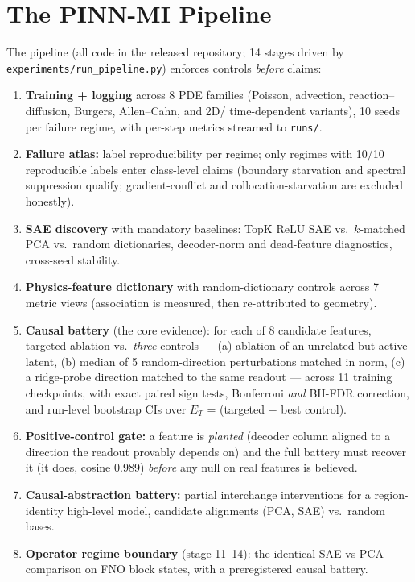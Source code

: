 \documentclass{article}
\newcommand{\ET}{E_T}
\begin{document}
\begin{table}[t]\centering\small
\caption{Geometry across the dimensional boundary: tangent rank equals input dimension; covariance participation ratio stays low.}\label{tab:geometry}

\end{table}

\section{The PINN-MI Pipeline}
\label{sec:method}

The pipeline (all code in the released repository; 14 stages driven by
\texttt{experiments/run\_pipeline.py}) enforces controls \emph{before} claims:

\begin{enumerate}
  \item \textbf{Training + logging} across 8 PDE families (Poisson,
        advection, reaction--diffusion, Burgers, Allen--Cahn, and 2D/
        time-dependent variants), 10 seeds per failure regime, with
        per-step metrics streamed to \texttt{runs/}.
  \item \textbf{Failure atlas:} label reproducibility per regime; only
        regimes with 10/10 reproducible labels enter class-level claims
        (boundary starvation and spectral suppression qualify;
        gradient-conflict and collocation-starvation are excluded
        honestly).
  \item \textbf{SAE discovery} with mandatory baselines: TopK ReLU SAE
        vs.\ $k$-matched PCA vs.\ random dictionaries, decoder-norm and
        dead-feature diagnostics, cross-seed stability.
  \item \textbf{Physics-feature dictionary} with random-dictionary
        controls across 7 metric views (association is measured, then
        re-attributed to geometry).
  \item \textbf{Causal battery} (the core evidence): for each of 8
        candidate features, targeted ablation vs.\ \emph{three} controls
        --- (a) ablation of an unrelated-but-active latent, (b) median of
        5 random-direction perturbations matched in norm, (c) a
        ridge-probe direction matched to the same readout --- across 11
        training checkpoints, with exact paired sign tests, Bonferroni
        \emph{and} BH-FDR correction, and run-level bootstrap CIs over
        $\ET$ = (targeted $-$ best control).
  \item \textbf{Positive-control gate:} a feature is \emph{planted}
        (decoder column aligned to a direction the readout provably
        depends on) and the full battery must recover it (it does, cosine
        0.989) \emph{before} any null on real features is believed.
  \item \textbf{Causal-abstraction battery:} partial interchange
        interventions for a region-identity high-level model, candidate
        alignments (PCA, SAE) vs.\ random bases.
  \item \textbf{Operator regime boundary} (stage 11--14): the identical
        SAE-vs-PCA comparison on FNO block states, with a preregistered
        causal battery.
\end{enumerate}
\end{document}

